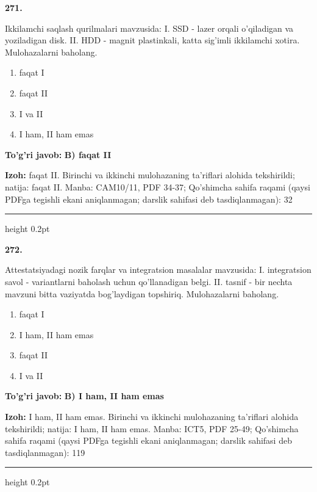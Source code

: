 \documentclass[10pt,a4paper]{article}
\begin{document}
{\bfseries\sffamily\color{ink} 271.}
\par
Ikkilamchi saqlash qurilmalari mavzusida: I. SSD - lazer orqali o'qiladigan va yoziladigan disk. II. HDD - magnit plastinkali, katta sig'imli ikkilamchi xotira. Mulohazalarni baholang.
\begin{enumerate}[label=\Alph*),leftmargin=9mm]
\item faqat I
\item faqat II
\item I va II
\item I ham, II ham emas
\end{enumerate}
\begin{tcolorbox}[enhanced,breakable,colback=teal!4,colframe=teal!60!black,boxrule=0.45pt,arc=1.2mm,left=2.7mm,right=2.7mm,top=1.8mm,bottom=1.8mm,before skip=2mm,after skip=2mm]
{\bfseries\sffamily\color{teal}To'g'ri javob:} \textbf{B) faqat II}
\par\smallskip
{\bfseries Izoh:} faqat II. Birinchi va ikkinchi mulohazaning ta'riflari alohida tekshirildi; natija: faqat II. Manba: CAM10/11, PDF 34-37; Qo'shimcha sahifa raqami (qaysi PDFga tegishli ekani aniqlanmagan; darslik sahifasi deb tasdiqlanmagan): 32
\end{tcolorbox}
\vspace{2mm}\hrule height 0.2pt\vspace{3mm}

{\bfseries\sffamily\color{ink} 272.}
\par
Attestatsiyadagi nozik farqlar va integratsion masalalar mavzusida: I. integratsion savol - variantlarni baholash uchun qo'llanadigan belgi. II. tasnif - bir nechta mavzuni bitta vaziyatda bog'laydigan topshiriq. Mulohazalarni baholang.
\begin{enumerate}[label=\Alph*),leftmargin=9mm]
\item faqat I
\item I ham, II ham emas
\item faqat II
\item I va II
\end{enumerate}
\begin{tcolorbox}[enhanced,breakable,colback=teal!4,colframe=teal!60!black,boxrule=0.45pt,arc=1.2mm,left=2.7mm,right=2.7mm,top=1.8mm,bottom=1.8mm,before skip=2mm,after skip=2mm]
{\bfseries\sffamily\color{teal}To'g'ri javob:} \textbf{B) I ham, II ham emas}
\par\smallskip
{\bfseries Izoh:} I ham, II ham emas. Birinchi va ikkinchi mulohazaning ta'riflari alohida tekshirildi; natija: I ham, II ham emas. Manba: ICT5, PDF 25-49; Qo'shimcha sahifa raqami (qaysi PDFga tegishli ekani aniqlanmagan; darslik sahifasi deb tasdiqlanmagan): 119
\end{tcolorbox}
\vspace{2mm}\hrule height 0.2pt\vspace{3mm}
\end{document}
